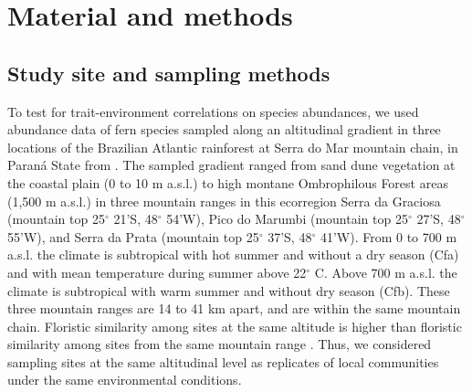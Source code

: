 \documentclass[12pt]{article}
\begin{document}
\section*{Material and methods}

\subsection*{Study site and sampling methods}
To test for trait-environment correlations on species
abundances, we used abundance data of fern species sampled along an
altitudinal gradient in three locations of the Brazilian Atlantic
rainforest at Serra do Mar mountain chain, in Paran\'a State from
\cite{Paciencia2008}.  The sampled gradient ranged from sand dune
vegetation at the coastal plain (0 to 10 m a.s.l.) to high montane
Ombrophilous Forest areas (1,500 m a.s.l.) in three mountain ranges in
this ecorregion Serra da Graciosa (mountain top 25{$^{\circ}$} 21'S,
48{$^{\circ}$} 54'W), Pico do Marumbi (mountain top 25{$^{\circ}$} 27'S,
48{$^{\circ}$} 55'W), and Serra da Prata (mountain top 25{$^{\circ}$} 37'S,
48{$^{\circ}$} 41'W). From 0 to 700 m a.s.l. the climate is
subtropical with hot summer and without a dry season (Cfa) and with
mean temperature during summer above 22{$^{\circ}$} C. Above 700 m
a.s.l. the climate is subtropical with warm summer and without dry
season (Cfb).
These three mountain ranges are 14 to 41 km apart, and are within the
same mountain chain. Floristic similarity among sites at the same
altitude is higher than floristic similarity
among sites from the same mountain range \citep{Paciencia2008}.
Thus, we considered sampling sites at the same altitudinal level as
replicates of local communities under the same environmental conditions. %
 
\end{document}
